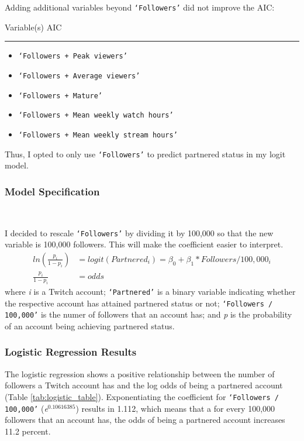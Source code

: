 \documentclass[12pt]{article}
\begin{document}
\noindent Adding additional variables beyond \texttt{`Followers'} did not improve the AIC:

\noindent Variable(s) \hfill AIC 
\hspace{0.4em}
\hrule
\begin{itemize}
    \item \texttt{`Followers + Peak viewers'} 
    \item \texttt{`Followers + Average viewers'} 
    \item \texttt{`Followers + Mature'} 
    \item \texttt{`Followers + Mean weekly watch hours'} 
    \item \texttt{`Followers + Mean weekly stream hours'} 
\end{itemize}
Thus, I opted to only use \texttt{`Followers'} to predict partnered status in my logit model.

\subsubsection{Model Specification}\

I decided to rescale \texttt{`Followers'} by dividing it by 100,000 so that the new variable is 100,000 followers. This will make the coefficient easier to interpret.
\begin{equation}
\begin{aligned}
	ln(\frac{p_{i}}{1-p_{i}}) & = logit(Partnered_{i})  = \beta_{0} + \beta_{1} \ast Followers/100,000_{i} \\
	\frac{p_{i}}{1-p_{i}} & = odds
\end{aligned}
\end{equation}
where \emph{i} is a Twitch account; \texttt{`Partnered'} is a binary variable indicating whether the respective account has attained partnered status or not; \texttt{`Followers / 100,000'} is the numer of followers that an account has; and \emph{p} is the probability of an account being achieving partnered status.

\subsubsection{Logistic Regression Results}

The logistic regression shows a positive relationship between the number of followers a Twitch account has and the log odds of being a partnered account (Table \ref{tab:logistic_table}). Exponentiating the coefficient for \texttt{`Followers / 100,000'} (\emph{e}$^{0.10616385}$)  results in 1.112, which means that a for every 100,000 followers that an account has, the odds of being a partnered account increases 11.2 percent.
\end{document}
